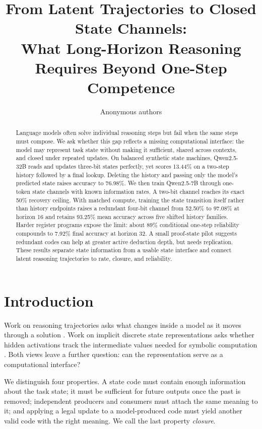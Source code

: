 \documentclass[10pt]{article}
\title{From Latent Trajectories to Closed State Channels:\\
What Long-Horizon Reasoning Requires Beyond One-Step Competence}
\author{Anonymous authors}
\date{}
\begin{document}
\maketitle

\begin{abstract}
Language models often solve individual reasoning steps but fail when the same
steps must compose. We ask whether this gap reflects a missing computational
interface: the model may represent task state without making it sufficient,
shared across contexts, and closed under repeated updates. On balanced
synthetic state machines, Qwen2.5-32B reads and updates three-bit states
perfectly, yet scores 13.44\% on a two-step history followed by a final lookup.
Deleting the history and passing only the model's predicted state raises
accuracy to 76.98\%. We then train Qwen2.5-7B through one-token state channels
with known information rates. A two-bit channel reaches its exact 50\%
recovery ceiling. With matched compute, training the state transition itself
rather than history endpoints raises a redundant four-bit channel from 52.50\%
to 97.08\% at horizon 16 and retains 93.25\% mean accuracy across five shifted
history families. Harder register programs expose the limit: about 89\%
conditional one-step reliability compounds to 7.92\% final accuracy at horizon
32. A small proof-state pilot suggests redundant codes can help at greater
active deduction depth, but needs replication. These results separate state
information from a usable state interface and connect latent reasoning
trajectories to rate, closure, and reliability.
\end{abstract}

\section{Introduction}

Work on reasoning trajectories asks what changes inside a model as it moves
through a solution \citep{sun2026trajectories}. Work on implicit discrete state
representations asks whether hidden activations track the intermediate values
needed for symbolic computation \citep{chen2024states}. Both views leave a
further question: can the representation serve as a computational interface?

We distinguish four properties. A state code must contain enough information
about the task state; it must be sufficient for future outputs once the past
is removed; independent producers and consumers must attach the same meaning
to it; and applying a legal update to a model-produced code must yield another
valid code with the right meaning. We call the last property \emph{closure}.
\end{document}
